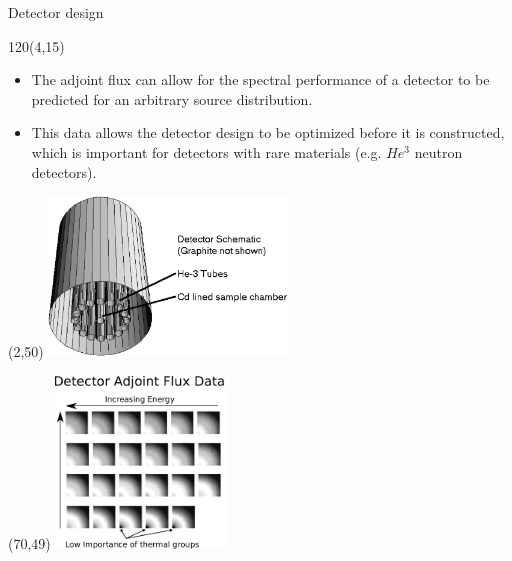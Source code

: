 \documentclass{beamer}
\begin{document}
\begin{frame}{Detector design}
  
  \begin{textblock}{120}(4,15)
    \begin{itemize}
      \item The adjoint flux can allow for the spectral performance of a 
        detector to be predicted for an arbitrary source distribution.
      \item This data allows the detector design to be optimized before it is
        constructed, which is important for detectors with rare materials 
        (e.g. $He^3$ neutron detectors).
    \end{itemize}
  \end{textblock}

  \begin{textblock}{20}(2,50)
    \includegraphics[width=2.5in]{figures/He3_detector.png}
  \end{textblock}

  \begin{textblock}{20}(70,49)
    \includegraphics[width=1.8in]{figures/He3_detector_adjoint_data_modified.pdf}
  \end{textblock}

\end{frame}

\end{document}
